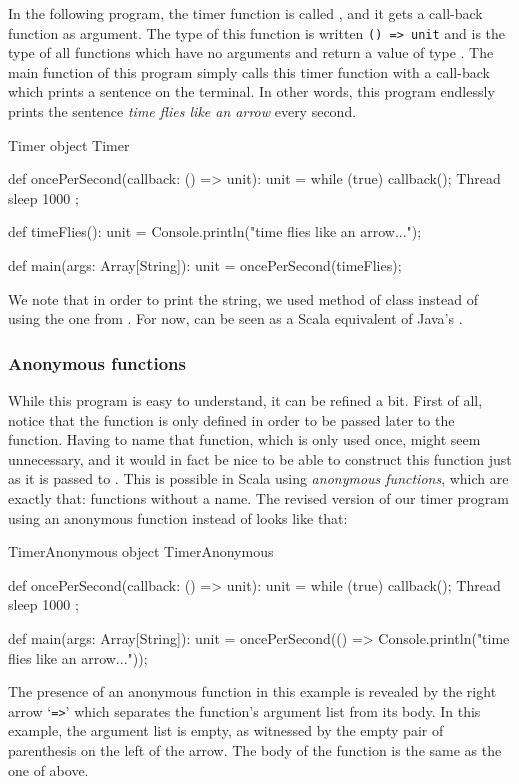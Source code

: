 \documentclass[a4paper,12pt,twoside,titlepage]{article}
\newcommand{\langname}[1]{#1\xspace}
\newcommand{\Scala}{\langname{Scala}}
\newcommand{\Java}{\langname{Java}}
\begin{document}
In the following program, the timer function is called
, and it gets a call-back function as argument.
The type of this function is written \verb|() => unit| and is the type
of all functions which have no arguments and return a value of type
. The main function of this program simply calls this
timer function with a call-back which prints a sentence on the
terminal. In other words, this program endlessly prints the sentence
\emph{time flies like an arrow} every second.
\begin{scalaprogram}{Timer}
object Timer {
  def oncePerSecond(callback: () => unit): unit =
    while (true) { callback(); Thread sleep 1000 };

  def timeFlies(): unit =
    Console.println("time flies like an arrow...");

  def main(args: Array[String]): unit =
    oncePerSecond(timeFlies);
}
\end{scalaprogram}
We note that in order to print the string, we used method
 of class  instead of using the one from
. For now,  can be seen as a \Scala
equivalent of \Java's .

\subsubsection{Anonymous functions}
\label{sec:anonymous-functions}

While this program is easy to understand, it can be refined a bit.
First of all, notice that the function  is only
defined in order to be passed later to the 
function. Having to name that function, which is only used once, might
seem unnecessary, and it would in fact be nice to be able to construct
this function just as it is passed to . This is
possible in \Scala using \emph{anonymous functions}, which are exactly
that: functions without a name. The revised version of our timer
program using an anonymous function instead of  looks
like that:
\begin{scalaprogram}{TimerAnonymous}
object TimerAnonymous {
  def oncePerSecond(callback: () => unit): unit =
    while (true) { callback(); Thread sleep 1000 };

  def main(args: Array[String]): unit =
    oncePerSecond(() =>
      Console.println("time flies like an arrow..."));
}
\end{scalaprogram}
The presence of an anonymous function in this example is revealed by
the right arrow `\verb|=>|' which separates the function's argument
list from its body. In this example, the argument list is empty, as
witnessed by the empty pair of parenthesis on the left of the arrow.
The body of the function is the same as the one of 
above.
\end{document}
